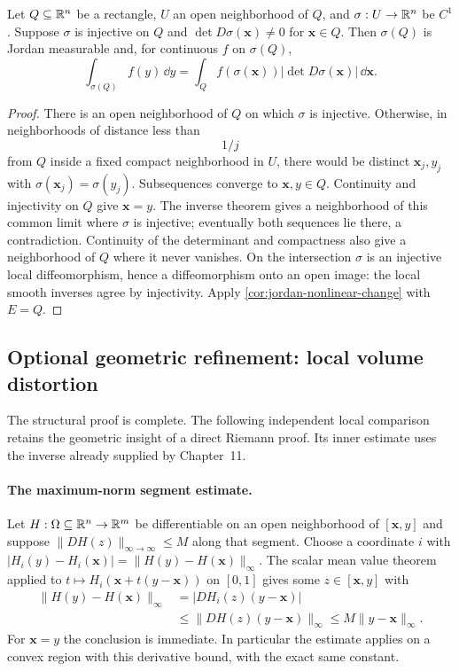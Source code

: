 \begin{theorem}\label{thm:change-of-variables}
Let $Q\subseteq\mathbb{R}^n$ be a rectangle, $U$ an open neighborhood of $Q$,
and $\sigma:U\to\mathbb{R}^n$ be $C^1$. Suppose $\sigma$ is injective on $Q$
and $\det D\sigma(\mathbf{x})\ne0$ for $\mathbf{x}\in Q$. Then $\sigma(Q)$ is Jordan
measurable and, for continuous $f$ on $\sigma(Q)$,
\[
\int_{\sigma(Q)}f(y)\,\dd y
=\int_Q f(\sigma(\mathbf{x}))|\det D\sigma(\mathbf{x})|\,\dd\mathbf{x}.
\]
\end{theorem}
\begin{proof}
There is an open neighborhood of $Q$ on which $\sigma$ is injective.
Otherwise, in neighborhoods of distance less than
\[
1/j
\]
 from $Q$
inside a fixed compact neighborhood in $U$, there would be distinct
$\mathbf{x}_j,y_j$ with $\sigma(\mathbf{x}_j)=\sigma(y_j)$. Subsequences converge to
$\mathbf{x},y\in Q$. Continuity and injectivity on $Q$ give $\mathbf{x}=y$.
The inverse theorem gives a neighborhood of this common limit where
$\sigma$ is injective; eventually both sequences lie there, a contradiction.
Continuity of the determinant and compactness also give a neighborhood
of $Q$ where it never vanishes. On the intersection $\sigma$ is an
injective local diffeomorphism, hence a diffeomorphism onto an open image:
the local smooth inverses agree by injectivity. Apply
\cref{cor:jordan-nonlinear-change} with $E=Q$.
\end{proof}

\subsection{Optional geometric refinement: local volume distortion}
The structural proof is complete. The following independent local
comparison retains the geometric insight of a direct Riemann proof.
Its inner estimate uses the inverse already supplied by Chapter~11.

\paragraph{The maximum-norm segment estimate.}
Let $H:\Omega\subseteq\mathbb{R}^n\to\mathbb{R}^m$ be differentiable on an open
neighborhood of $[\mathbf{x},y]$ and suppose
$\|DH(z)\|_{\infty\to\infty}\leq M$ along that segment.
Choose a coordinate $i$ with
$|H_i(y)-H_i(\mathbf{x})|=\|H(y)-H(\mathbf{x})\|_\infty$.
The scalar mean value theorem applied to
$t\mapsto H_i(\mathbf{x}+t(y-\mathbf{x}))$ on $[0,1]$ gives some $z\in[\mathbf{x},y]$ with
\[
\begin{aligned}
\|H(y)-H(\mathbf{x})\|_\infty
&=|DH_i(z)(y-\mathbf{x})|\\
&\leq\|DH(z)(y-\mathbf{x})\|_\infty
\leq M\|y-\mathbf{x}\|_\infty.
\end{aligned}
\]
For $\mathbf{x}=y$ the conclusion is immediate. In particular the estimate applies
on a convex region with this derivative bound, with the exact same constant.

